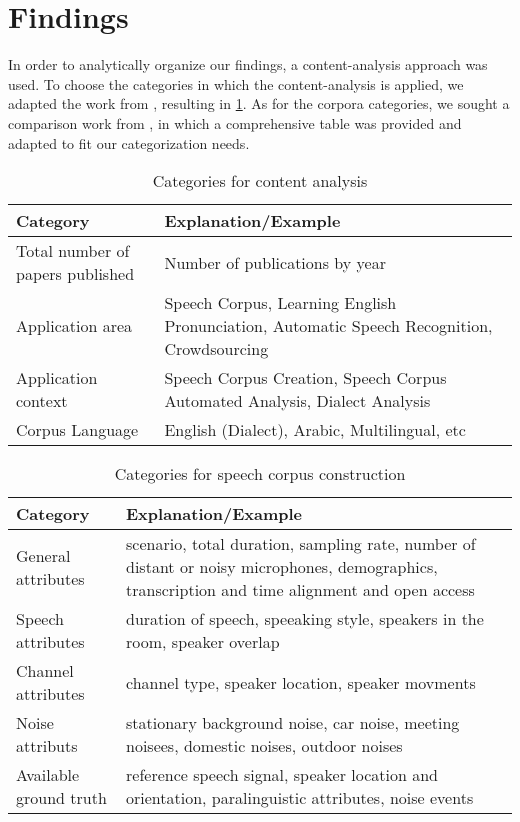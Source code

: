 \documentclass[conference]{IEEEtran}
\begin{document}
\section{Findings}

In order to analytically organize our findings, a content-analysis approach was used. To choose the categories in which the content-analysis is applied, we adapted the work from \cite{queiroz2019blockchain}, resulting in \ref{tab:content-analysis}. As for the corpora categories, we sought a comparison work from  \cite{LeRouxVincent2014TRdatasets}, in which a comprehensive table was provided and adapted to fit our categorization needs.

\begin{table}[h]
    \centering
    \begin{tabular}{|p{4cm}|p{4cm}|}
        \hline Category & Explanation/Example \\ \hline
        Total number of papers published & Number of publications by year \\ \hline
        Application area & Speech Corpus, Learning English Pronunciation, Automatic Speech Recognition, Crowdsourcing \\ \hline
        Application context & Speech Corpus Creation, Speech Corpus Automated Analysis, Dialect Analysis \\ \hline
        Corpus Language & English (Dialect), Arabic, Multilingual, etc \\ \hline
    \end{tabular}
    \caption{Categories for content analysis}
    \label{tab:content-analysis}
\end{table}

\begin{table}[h]
    \centering
    \begin{tabular}{|p{2cm}|p{6cm}|}
        \hline Category & Explanation/Example \\ \hline
        General attributes & scenario, total duration, sampling rate, number of distant or noisy microphones, demographics, transcription and time alignment and open access \\ \hline
        Speech attributes & duration of speech, speeaking style, speakers in the room, speaker overlap\\ \hline
        Channel attributes & channel type, speaker location, speaker movments \\ \hline
        Noise attributs & stationary background noise, car noise, meeting noisees, domestic noises, outdoor noises \\ \hline
        Available ground truth & reference speech signal, speaker location and orientation, paralinguistic attributes, noise events \\ \hline
    \end{tabular}
    \caption{Categories for speech corpus construction}
    \label{tab:speech-analysis}
\end{table}
\end{document}
